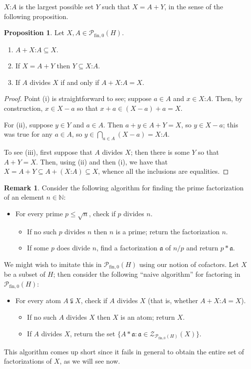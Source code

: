 \documentclass{report}
\renewcommand{\aa}{\mathfrak{a}}
\newcommand{\NN}{\mathbb{N}}
\renewcommand{\P}{\mathcal{P}}
\newcommand{\Z}{\mathcal{Z}}
\newcommand{\fon}{{\textrm{fin}, 0}}
\renewcommand{\:}{\text{:}}
\theoremstyle{definition}
\newtheorem{prop}[defn]{Proposition}
\newtheorem{rk}[defn]{Remark}
\begin{document}
$X\:A$ is the largest possible set $Y$ such that $X = A + Y$, in the sense of the following proposition.

\begin{prop} \label{prop:cofactors}
	Let $X,A \in \P_\fon(H)$. 
	\begin{enumerate}[label={\rm (\roman{*})}]
		\item $A + X\:A \subseteq X$.
		\item If $X = A + Y$ then $Y \subseteq X\:A$.
		\item If $A$ divides $X$ if and only if $A + X\:A = X$.
	\end{enumerate}
\end{prop}

\begin{proof}
	Point (i) is straightforward to see; suppose $a\in A$ and $x\in X\:A$.
	Then, by construction, $x\in X-a$ so that $x+a \in (X-a) +a = X$.
	
	For (ii), suppose $y\in Y$ and $a\in A$.
	Then $a+y \in A + Y = X$, so $y \in X-a$; this was true for any $a\in A$, so $y\in \bigcap_{a\in A} (X-a) = X\:A$.
	
	To see (iii), first suppose that $A$ divides $X$; then there is some $Y$ so that $A + Y = X$.
	Then, using (ii) and then (i), we have that $X = A+Y \subseteq A+ (X\:A) \subseteq X$, whence all the inclusions are equalities.
\end{proof}


\begin{rk}
Consider the following algorithm for finding the prime factorization of an element $n\in \NN$:
\begin{itemize}
	\item For every prime $p \le \sqrt{n}$, check if $p$ divides $n$.
	\begin{itemize}
		\item If no such $p$ divides $n$ then $n$ is a prime; return the factorization $n$.
		\item If some $p$ does divide $n$, find a factorization $\aa$ of $n/p$ and return $p * \aa$.
	\end{itemize}
\end{itemize}
	
We might wish to imitate this in $\P_\fon(H)$ using our notion of cofactors.
Let $X$ be a subset of $H$; then consider the following ``naive algorithm'' for factoring in $\P_\fon(H)$:
\begin{itemize}
	\item For every atom $A \subsetneqq X$, check if $A$ divides $X$ (that is, whether $A + X\:A = X$).
	\begin{itemize}
		\item If no such $A$ divides $X$ then $X$ is an atom; return $X$.
		\item If $A$ divides $X$, return the set $\{A * \aa: \aa\in \Z_{\P_\fon(H)}(X) \}$.
	\end{itemize}
\end{itemize}
This algorithm comes up short since it fails in general to obtain the entire set of factorizations of $X$, as we will see now.
\end{rk}
\end{document}
